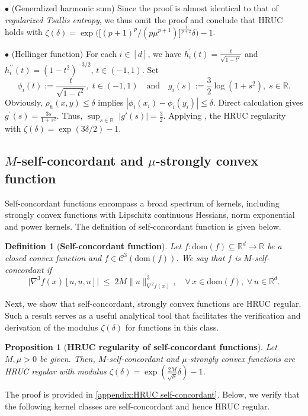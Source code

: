 \documentclass{article}
\theoremstyle{plain}
\newtheorem{proposition}[theorem]{Proposition}
\newtheorem{definition}[theorem]{Definition}
\theoremstyle{definition}
\theoremstyle{remark}
\newcommand{\cC}{\mathcal C}
\newcommand{\R}{\mathbb{R}}
\newcommand{\Rd}{\mathbb{R}^d}
\newcommand{\dom}[1]{\mathrm{dom}(#1)}
\begin{document}
\noindent $\bullet$ {(Generalized harmonic sum)} 
Since the proof is almost identical to that of \emph{regularized Tsallis entropy}, we thus omit the proof and conclude that HRUC holds with $\zeta(\delta)=\exp\big(\big[(p+1)^p/(p\mu^{p+1})\big]^{\frac{1}{p+2}}\delta\big)-1$.\par\smallskip

\noindent $\bullet$ {(Hellinger function)} For each $i\in[d]$, we have $h_i^\prime(t)=\frac{t}{\sqrt{1-t^2}}$ and $h_i^{\prime\prime}(t)=(1-t^2)^{-3/2}$, $t\in(-1,1)$. Set
\[
\phi_i(t):=\frac{t}{\sqrt{1-t^2}},\;t\in(-1,1)\quad \text{and} \quad g_i(s):=\frac32\log(1+s^2),\; s\in\R.
\]
Obviously, $\rho_h(x,y)\leq \delta$ implies $|\phi_i(x_i)-\phi_i(y_i)|\leq \delta$. 
Direct calculation gives 
$g^\prime(s)=\frac{3s}{1+s^2}$. Thus, ${\sup}_{s\in\mathbb{R}}\;|g'(s)|=\frac32$.
Applying , the HRUC regularity with $\zeta(\delta)=\exp(3\delta/2)-1$.

\subsection{\texorpdfstring{$M$-self-concordant and $\mu$-strongly convex function}
{M-self-concordant and mu-strongly convex function}}\label{subsec:Self-concordant}
Self-concordant functions encompass a broad spectrum of kernels, including strongly convex functions with Lipschitz continuous Hessians,  norm exponential and power kernels. 
The definition of self-concordant function \cite[Definition 5.1.1]{Nesterov2018} is given below.
\begin{definition}[\textbf{Self-concordant function}]
Let $f:\dom f\subseteq\Rd \to\R$ be a closed convex function 
and $f\in \cC^3(\dom f)$. We say that $f$ is \emph{$M$-self-concordant} if %
\[
\big|\nabla^3 f(x)[u,u,u]\big|
\;\leq\;
2M\|u\|^3_{\nabla^2 f(x)},\quad \forall\,x\in\dom f,\; \forall\, u\in\R^{d}.
\]
\end{definition}
Next, we show that self-concordant, strongly convex  functions are HRUC regular. Such a result serves as a useful analytical tool that facilitates the verification and derivation of the modulus $\zeta(\delta)$ for functions in this class.

\begin{proposition}[\textbf{HRUC regularity of self-concordant functions}]\label{prop:HRUC self-concordant}
    Let $M,\mu>0$ be given. Then, $M$-self-concordant and $\mu$-strongly convex functions are HRUC regular with modulus $\zeta(\delta)=\exp(\frac{2M}{\sqrt{\mu}}\delta)-1$.
\end{proposition}
The proof is provided in \cref{appendix:HRUC self-concordant}. Below, we verify that the following kernel classes are self-concordant and hence HRUC regular.
\smallskip
\end{document}
